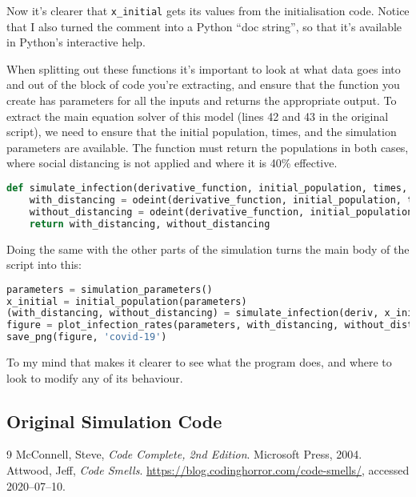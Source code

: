 \documentclass[a4paper]{article}
\begin{document}
Now it's clearer that \texttt{x\_initial} gets its values from the initialisation code. Notice that I also turned the comment into a Python ``doc string'', so that it's available in Python's interactive help.

When splitting out these functions it's important to look at what data goes into and out of the block of code you're extracting, and ensure that the function you create has parameters for all the inputs and returns the appropriate output. To extract the main equation solver of this model (lines 42 and 43 in the original script), we need to ensure that the initial population, times, and the simulation parameters are available. The function must return the populations in both cases, where social distancing is not applied and where it is 40\% effective.

\begin{lstlisting}[language=Python]
def simulate_infection(derivative_function, initial_population, times, social_distance_effectivess, alpha, beta, gamma):
    with_distancing = odeint(derivative_function, initial_population, times, args=(social_distance_effectivess, alpha, beta, gamma)).T
    without_distancing = odeint(derivative_function, initial_population, times, args=(0, alpha, beta, gamma)).T
    return with_distancing, without_distancing
\end{lstlisting}

Doing the same with the other parts of the simulation turns the main body of the script into this:

\begin{lstlisting}[language=Python]
parameters = simulation_parameters()
x_initial = initial_population(parameters)
(with_distancing, without_distancing) = simulate_infection(deriv, x_initial, parameters)
figure = plot_infection_rates(parameters, with_distancing, without_distancing)
save_png(figure, 'covid-19')
\end{lstlisting}

To my mind that makes it clearer to see what the program does, and where to look to modify any of its behaviour.

\begin{appendices}
\section{Original Simulation Code\label{code-appendix}}



\end{appendices}

\begin{thebibliography}{9}
   McConnell, Steve, \textit{Code Complete, 2nd Edition}. Microsoft Press, 2004.
   Attwood, Jeff, \textit{Code Smells}. \url{https://blog.codinghorror.com/code-smells/}, accessed 2020--07--10.
\end{thebibliography}
\end{document}
